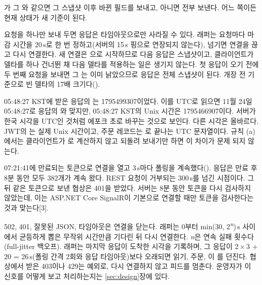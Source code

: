 

 가 그 와 같으면 그 스냅샷 이후 바뀐 필드를 보내고, 아니면 전부 보낸다. 어느 쪽이든 현재 상태가 새 기준이 된다.

 요청을 하나만 보내 두면 응답은 타임아웃으로만 사라질 수 있다. 래퍼는 요청마다 마감 시간을 20\,s로 한 번 정하고(서버의 15\,s 핑으로 연장되지 않는다), 넘기면 연결을 끊고 다시 연결한다. 새 연결은 으로 시작하므로 다음 응답은 스냅샷이고, 클라이언트가 델타를 하나 건너뛴 채 다음 델타를 적용하는 일은 생기지 않는다. 첫 응답이 오기 전에 두 번째 요청을 보내면 그 는 이미 낡았으므로 응답은 전체 스냅샷이 된다. 개장 전 기준으로 빈 델타의 17배 크기다().

 05:48:27 KST에 받은 응답의 는 1795499307이었다. 이를 UTC로 읽으면 11월 24일 05:48:27로 응답의 와 맞지만, 05:48:27 KST의 Unix 시간은 1795466907이다. 서버가 한국 시각을 UTC인 것처럼 에포크 초로 바꾸는 것으로 보인다. 다른 시각은 올바르다. JWT의 는 실제 Unix 시간이고, 주문 레코드는 로 끝나는 UTC 문자열이다. 규칙 (a)에서는 클라이언트가 로 계산하지 않고 되돌려 보내기만 하면 이 차이가 문제 되지 않는다.

 07:21:41에 만료되는 토큰으로 연결을 열고 3\,s마다 폴링을 계속했다(). 응답은 만료 후 8분 동안 모두 382개가 계속 왔다. REST 요청이 거부되는 300\,s를 넘긴 시점이다. 그 뒤 같은 토큰으로 보낸 협상은 401을 받았다. 서버는 8분 동안 토큰을 다시 검사하지 않았는데, 이는 ASP.NET Core SignalR이 기본으로 연결할 때만 토큰을 검사한다는 것과 맞는다[3].

 502, 401, 잘못된 JSON, 타임아웃은 연결을 닫는다. 래퍼는 0부터 min(30, 2\textsuperscript{\textit{n}})\,s 사이에서 균등하게 뽑은 무작위 시간만큼 기다린 뒤 다시 연결한다. \textit{n}은 연속 실패 횟수다(full-jitter 백오프). 래퍼는 마지막 응답이 도착한 시각을 기록하며, 그 응답이 2\,×\,3 + 20 = 26\,s(폴링 간격 2회와 응답 타임아웃)보다 오래되면 읽기, 주문, 이 를 던진다. 협상에서 받은 403이나 429는 예외로, 다시 연결하지 않고 피드를 멈춘다. 운영자가 이 신호를 어떻게 보고 처리하는지는 \ref{sec:design}장에 있다.

